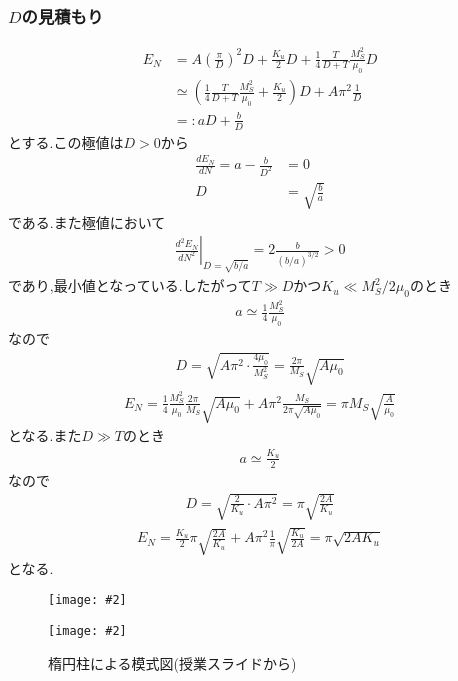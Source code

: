 \documentclass[uplatex,a4j,11pt,dvipdfmx]{jsarticle}
\makeatletter
\def\fgcaption{\def\@captype{figure}\caption}
\newcommand{\mfig}[3][width=15cm]{
\begin{center}
\texttt{[image: \#2]}
\fgcaption{#3 \label{fig:#2}}
\end{center}
}
\makeatother
\begin{document}
\subsubsection*{$D$の見積もり}
\begin{align*}
  E_N&=A\left(\frac{\pi}{D}\right)^2D+\frac{K_u}{2}D+\frac{1}{4}\frac{T}{D+T}\frac{M_S^2}{\mu_0}D\\
  &\simeq \left(\frac{1}{4}\frac{T}{D+T}\frac{M_S^2}{\mu_0}+\frac{K_u}{2}\right)D+A\pi^2\frac{1}{D}\\
  &=:aD+\frac{b}{D}
\end{align*}
とする.この極値は$D>0$から
\begin{align*}
  \frac{d E_N}{d N}=a-\frac{b}{D^2}&=0\\
  D&=\sqrt{\frac{b}{a}}
\end{align*}
である.また極値において
\begin{align*}
  \left.\frac{d^2E_N}{dN^2}\right|_{D=\sqrt{b/a}}=2\frac{b}{(b/a)^{3/2}}>0
\end{align*}
であり,最小値となっている.したがって$T\gg D$かつ$K_u\ll M_S^2/2\mu_0$のとき
\begin{align*}
  a\simeq \frac{1}{4}\frac{M_S^2}{\mu_0}
\end{align*}
なので
\begin{align}
  D=\sqrt{A\pi^2\cdot\frac{4\mu_0}{M_S^2}}=\frac{2\pi}{M_S}\sqrt{A\mu_0}
\end{align}
\begin{align}
  E_N=\frac{1}{4}\frac{M_S^2}{\mu_0}\frac{2\pi}{M_S}\sqrt{A\mu_0}+A\pi^2\frac{M_S}{2\pi\sqrt{A\mu_0}}=\pi M_S\sqrt{\frac{A}{\mu_0}}
\end{align}
となる.また$D\gg T$のとき
\begin{align*}
  a\simeq\frac{K_u}{2}
\end{align*}
なので
\begin{align}
  D=\sqrt{\frac{2}{K_u}\cdot A\pi^2}=\pi\sqrt{\frac{2A}{K_u}}
\end{align}
\begin{align}
  E_N=\frac{K_u}{2}\pi\sqrt{\frac{2A}{K_u}}+A\pi^2\frac{1}{\pi}\sqrt{\frac{K_u}{2A}}=\pi\sqrt{2AK_u}
\end{align}
となる.
\begin{figure}[htbp]
  \begin{minipage}[b]{0.5\linewidth}
    \mfig[width=5cm]{fig/fig1.png}{Neel磁壁の断面図(授業スライドから)}
  \end{minipage}
  \begin{minipage}[b]{0.5\linewidth}
    \mfig[width=5cm]{fig/fig2.png}{楕円柱による模式図(授業スライドから)}
  \end{minipage}
\end{figure}
\end{document}
